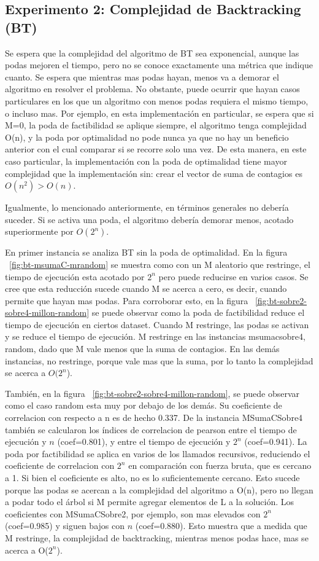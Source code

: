 \documentclass[10pt,a4paper]{article}
\begin{document}
\subsection{Experimento 2: Complejidad de Backtracking (BT)}

Se espera que la complejidad del algoritmo de BT sea exponencial, aunque las podas mejoren el tiempo, pero no se conoce exactamente una métrica que indique cuanto. Se espera que mientras mas podas hayan, menos va a demorar el algoritmo en resolver el problema. No obstante, puede ocurrir que hayan casos particulares en los que un algoritmo con menos podas requiera el mismo tiempo, o incluso mas. Por ejemplo, en esta implementación en particular, se espera que si M=0, la poda de factibilidad se aplique siempre, el algoritmo tenga complejidad O(n), y la poda por optimalidad no pode nunca ya que no hay un beneficio anterior con el cual comparar si se recorre solo una vez. De esta manera, en este caso particular, la implementación con la poda de optimalidad tiene mayor complejidad que la implementación sin: crear el vector de suma de contagios es $O(n^2) > O(n)$.

Igualmente, lo mencionado anteriormente, en términos generales no debería suceder. Si se activa una poda, el algoritmo debería demorar menos, acotado superiormente por $O(2^n)$. 

En primer instancia se analiza BT sin la poda de optimalidad. En la figura ~\ref{fig:bt-msumaC-mrandom} se muestra como con un M aleatorio que restringe, el tiempo de ejecución esta acotado por $2^n$ pero puede reducirse en varios casos. Se cree que esta reducción sucede cuando M se acerca a cero, es decir, cuando permite que hayan mas podas. Para corroborar esto, en la figura ~\ref{fig:bt-sobre2-sobre4-millon-random} se puede observar como la poda de factibilidad reduce el tiempo de ejecución en ciertos dataset. Cuando M restringe, las podas se activan y se reduce el tiempo de ejecución. M restringe en las instancias msumacsobre4, random, dado que M vale menos que la suma de contagios. En las demás instancias, no restringe, porque vale mas que la suma, por lo tanto la complejidad se acerca a $O(2^n$). 

También, en la figura ~\ref{fig:bt-sobre2-sobre4-millon-random}, se puede observar como el caso random esta muy por debajo de los demás. Su coeficiente de correlacion con respecto a n es de hecho 0.337. De la instancia MSumaCSobre4 también se calcularon los índices de correlacion de pearson entre el tiempo de ejecución y $n$ (coef=0.801), y entre el tiempo de ejecución y $2^n$ (coef=0.941). La poda por factibilidad se aplica en varios de los llamados recursivos, reduciendo el coeficiente de correlacion con $2^n$ en comparación con fuerza bruta, que es cercano a 1. Si bien el coeficiente es alto, no es lo suficientemente cercano. Esto sucede porque las podas se acercan a la complejidad del algoritmo a O(n), pero no llegan a podar todo el árbol si M permite agregar elementos de L a la solución. Los coeficientes con MSumaCSobre2, por ejemplo, son mas elevados con $2^n$ (coef=0.985) y siguen bajos con $n$ (coef=0.880). Esto muestra que a medida que M restringe, la complejidad de backtracking, mientras menos podas hace, mas se acerca a O($2^n$).
 
\end{document}
